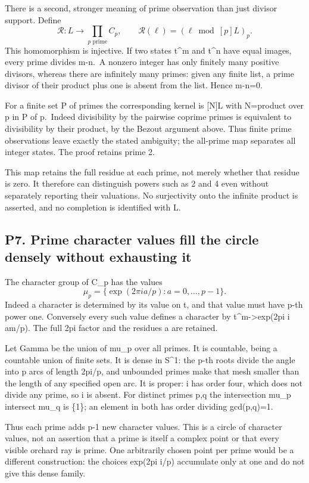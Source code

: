 \documentclass[
  11pt,
]{article}
\begin{document}
There is a second, stronger meaning of prime observation than just
divisor support. Define \[
\mathcal R:L\longrightarrow\prod_{p\text{ prime}} C_p,
\qquad\mathcal R(\ell)=(\ell\bmod[p]L)_p.
\] This homomorphism is injective. If two states t\^{}m and t\^{}n have
equal images, every prime divides m-n.~A nonzero integer has only
finitely many positive divisors, whereas there are infinitely many
primes: given any finite list, a prime divisor of their product plus one
is absent from the list. Hence m-n=0.

For a finite set P of primes the corresponding kernel is {[}N{]}L with
N=product over p in P of p.~Indeed divisibility by the pairwise coprime
primes is equivalent to divisibility by their product, by the Bezout
argument above. Thus finite prime observations leave exactly the stated
ambiguity; the all-prime map separates all integer states. The proof
retains prime 2.

This map retains the full residue at each prime, not merely whether that
residue is zero. It therefore can distinguish powers such as 2 and 4
even without separately reporting their valuations. No surjectivity onto
the infinite product is asserted, and no completion is identified with
L.

\subsection{P7. Prime character values fill the circle densely without
exhausting
it}\label{p7.-prime-character-values-fill-the-circle-densely-without-exhausting-it}

The character group of C\_p has the values \[
\mu_p=\{\exp(2\pi i a/p):a=0,\ldots,p-1\}.
\] Indeed a character is determined by its value on t, and that value
must have p-th power one. Conversely every such value defines a
character by t\^{}m-\textgreater exp(2pi i am/p). The full 2pi factor
and the residues a are retained.

Let Gamma be the union of mu\_p over all primes. It is countable, being
a countable union of finite sets. It is dense in S\^{}1: the p-th roots
divide the angle into p arcs of length 2pi/p, and unbounded primes make
that mesh smaller than the length of any specified open arc. It is
proper: i has order four, which does not divide any prime, so i is
absent. For distinct primes p,q the intersection mu\_p intersect mu\_q
is \{1\}; an element in both has order dividing gcd(p,q)=1.

Thus each prime adds p-1 new character values. This is a circle of
character values, not an assertion that a prime is itself a complex
point or that every visible orchard ray is prime. One arbitrarily chosen
point per prime would be a different construction: the choices exp(2pi
i/p) accumulate only at one and do not give this dense family.
\end{document}
